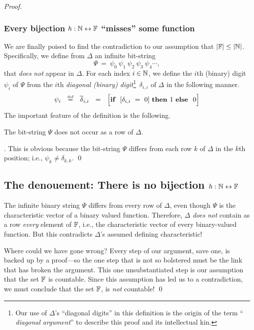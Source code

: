 \begin{proof}
\subsubsection{Every bijection $h: \mathbb{N} \leftrightarrow \mathbb{F}$ ``misses'' some function}

We are finally poised to find the contradiction to our assumption that
$|\mathbb{F}| \leq |\mathbb{N}|$.  Specifically, we define from $\Delta$ an infinite
bit-string
\[ \Psi \ = \ \psi_0 \ \psi_1 \ \psi_2 \ \psi_3 \ \psi_4 \cdots, \]
that {\em does not} appear in $\Delta$.  For each index $i \in \mathbb{N}$, we
define the $i$th (binary) digit $\psi_i$ of $\Psi$ from the $i$th {\em
  diagonal (binary) digit}\footnote{Our use of $\Delta$'s ``diagonal
  digits'' in this definition is the origin of the term ``{\em
    diagonal argument}''  to describe this
  proof and its intellectual kin.}~$\delta_{i,i}$ of $\Delta$ in the
following manner.
\[ \psi_i \ \ \stackrel{\mbox{{\tiny def}}}{=} \ \ \overline{\delta}_{i,i} \ \ = \ \
\Big[\mbox{\bf if } \ [\delta_{i,i} \ = \ 0] \ \mbox{\bf then } 1 \
\mbox{\bf else } \ 0 \Big]
\]
The important feature of the definition is the following.

\begin{lemma}
\label{lem:PSI-notin-DELTA}
The bit-string $\Psi$ does not occur as a row of $\Delta$.
\end{lemma}

.
This is obvious because the bit-string
$\Psi$ differs from each row $k$ of $\Delta$ in the $k$th position; i.e.,
$\psi_k \neq \delta_{k,k}$.  \qed

\subsection{The denouement: There is no bijection  $h: \mathbb{N} \leftrightarrow \mathbb{F}$}

The infinite binary string $\Psi$ differs from every row of $\Delta$,
even though $\Psi$ is the characteristic vector of a binary valued
function.  Therefore, $\Delta$ {\em does not} contain as a row {\em
  every} element of $\mathbb{F}$, i.e., the characteristic vector of every
binary-valued function.  But this contradicts $\Delta$'s assumed
defining characteristic!

Where could we have gone wrong?  Every step of our argument, save one,
is backed up by a proof---so the one step that is not so bolstered
must be the link that has broken the argument.  This one
unsubstantiated step is our assumption that the set $\mathbb{F}$ is countable.
Since this assumption has led us to a contradiction, we must conclude
that the set $\mathbb{F}$, is {\em not} countable!  \qed
\end{proof}





